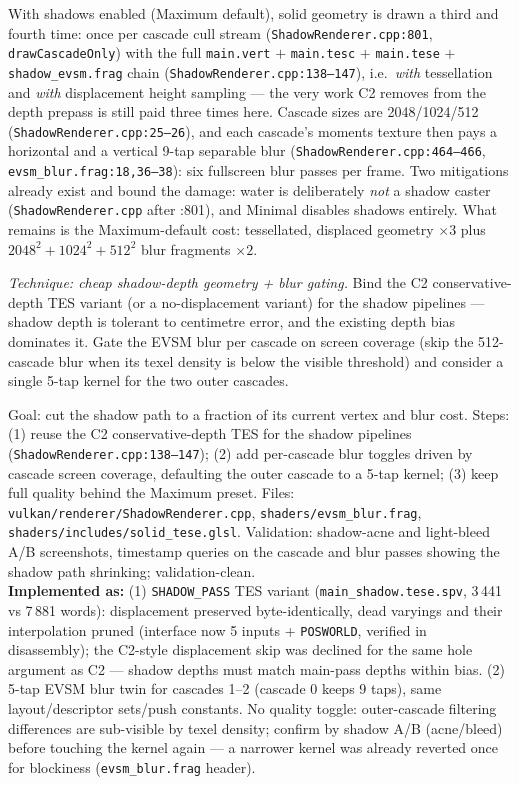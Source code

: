 \documentclass[11pt,a4paper]{article}
\begin{document}
With shadows enabled (Maximum default), solid geometry is drawn a third and
fourth time: once per cascade cull stream
(\texttt{ShadowRenderer.cpp:801}, \texttt{drawCascadeOnly}) with the full
\texttt{main.vert} $+$ \texttt{main.tesc} $+$ \texttt{main.tese} $+$
\texttt{shadow\_evsm.frag} chain (\texttt{ShadowRenderer.cpp:138--147}), i.e.\
\emph{with} tessellation and \emph{with} displacement height sampling --- the
very work C2 removes from the depth prepass is still paid three times here.
Cascade sizes are 2048/1024/512
(\texttt{ShadowRenderer.cpp:25--26}), and each cascade's moments texture then
pays a horizontal and a vertical 9-tap separable blur
(\texttt{ShadowRenderer.cpp:464--466}, \texttt{evsm\_blur.frag:18,36--38}):
six fullscreen blur passes per frame. Two mitigations already exist and bound
the damage: water is deliberately \emph{not} a shadow caster
(\texttt{ShadowRenderer.cpp} after :801), and Minimal disables shadows
entirely. What remains is the Maximum-default cost: tessellated, displaced
geometry $\times 3$ plus $2048^2 + 1024^2 + 512^2$ blur fragments $\times 2$.

\textit{Technique: cheap shadow-depth geometry + blur gating.} Bind the C2
conservative-depth TES variant (or a no-displacement variant) for the shadow
pipelines --- shadow depth is tolerant to centimetre error, and the existing
depth bias dominates it. Gate the EVSM blur per cascade on screen coverage
(skip the 512-cascade blur when its texel density is below the visible
threshold) and consider a single 5-tap kernel for the two outer cascades.

\begin{tcolorbox}[promptbox={Prompt --- H4: cheap shadow geometry and gated EVSM blur}]
Goal: cut the shadow path to a fraction of its current vertex and blur cost.
Steps: (1) reuse the C2 conservative-depth TES for the shadow pipelines
(\texttt{ShadowRenderer.cpp:138--147}); (2) add per-cascade blur toggles driven
by cascade screen coverage, defaulting the outer cascade to a 5-tap kernel;
(3) keep full quality behind the Maximum preset. Files:
\texttt{vulkan/renderer/ShadowRenderer.cpp},
\texttt{shaders/evsm\_blur.frag}, \texttt{shaders/includes/solid\_tese.glsl}.
Validation: shadow-acne and light-bleed A/B screenshots, timestamp queries on
the cascade and blur passes showing the shadow path shrinking;
validation-clean.
\\ \textbf{Implemented as:} (1) \texttt{SHADOW\_PASS} TES variant
(\texttt{main\_shadow.tese.spv}, 3\,441 vs 7\,881 words): displacement
preserved byte-identically, dead varyings and their interpolation pruned
(interface now 5 inputs + \texttt{POSWORLD}, verified in disassembly); the
C2-style displacement skip was declined for the same hole argument as C2 ---
shadow depths must match main-pass depths within bias. (2) 5-tap EVSM blur
twin for cascades 1--2 (cascade 0 keeps 9 taps), same layout/descriptor
sets/push constants. No quality toggle: outer-cascade filtering differences
are sub-visible by texel density; confirm by shadow A/B (acne/bleed) before
touching the kernel again --- a narrower kernel was already reverted once
for blockiness (\texttt{evsm\_blur.frag} header).
\end{tcolorbox}
\end{document}
